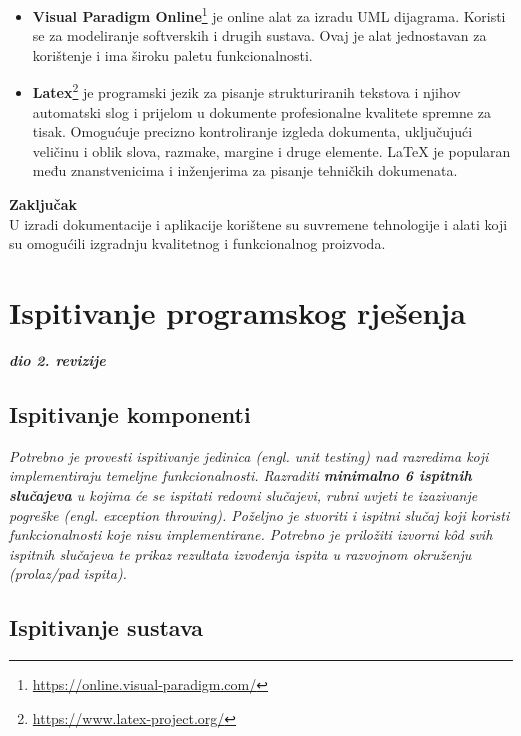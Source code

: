 \begin{itemize}
			\item\textbf{Visual Paradigm Online}\footnote{\url{https://online.visual-paradigm.com/}} je online alat za izradu UML dijagrama. Koristi se za modeliranje softverskih i drugih sustava. Ovaj je alat jednostavan za korištenje i ima široku paletu funkcionalnosti. 
			
			\item\textbf{Latex}\footnote{\url{https://www.latex-project.org/}} je programski jezik za pisanje strukturiranih tekstova i njihov automatski slog i prijelom u dokumente profesionalne kvalitete spremne za tisak. Omogućuje precizno kontroliranje izgleda dokumenta, uključujući veličinu i oblik slova, razmake, margine i druge elemente. LaTeX je popularan među znanstvenicima i inženjerima za pisanje tehničkih dokumenata.
			\end{itemize}
			
			\textbf{Zaključak}\\
			U izradi dokumentacije i aplikacije korištene su suvremene tehnologije i alati koji su omogućili izgradnju kvalitetnog i funkcionalnog proizvoda.
			
			
		
	
		\section{Ispitivanje programskog rješenja}
			
			\textbf{\textit{dio 2. revizije}}\\
	
			
			\subsection{Ispitivanje komponenti}
			\textit{Potrebno je provesti ispitivanje jedinica (engl. unit testing) nad razredima koji implementiraju temeljne funkcionalnosti. Razraditi \textbf{minimalno 6 ispitnih slučajeva} u kojima će se ispitati redovni slučajevi, rubni uvjeti te izazivanje pogreške (engl. exception throwing). Poželjno je stvoriti i ispitni slučaj koji koristi funkcionalnosti koje nisu implementirane. Potrebno je priložiti izvorni kôd svih ispitnih slučajeva te prikaz rezultata izvođenja ispita u razvojnom okruženju (prolaz/pad ispita). }
			
			
			
			\subsection{Ispitivanje sustava}
			
